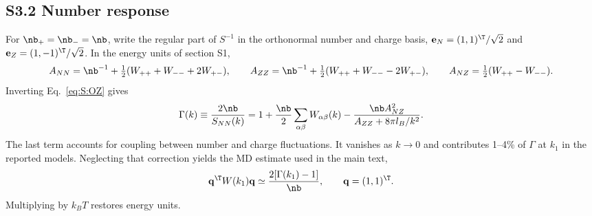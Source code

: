 \subsection*{S3.2 Number response}
For $\nb_+=\nb_-=\nb$, write the regular part of $S^{-1}$ in the orthonormal number and charge basis, $\mathbf e_N=(1,1)^{\T}/\sqrt2$ and $\mathbf e_Z=(1,-1)^{\T}/\sqrt2$. In the energy units of section S1,
\[
A_{NN}=\nb^{-1}+\tfrac12(W_{++}+W_{--}+2W_{+-}),\qquad
A_{ZZ}=\nb^{-1}+\tfrac12(W_{++}+W_{--}-2W_{+-}),\qquad
A_{NZ}=\tfrac12(W_{++}-W_{--}).
\]
Inverting Eq.~\ref{eq:S:OZ} gives
\begin{equation}
\Gamma(k)\equiv\frac{2\nb}{S_{NN}(k)}
=1+\frac{\nb}{2}\sum_{\alpha\beta}W_{\alpha\beta}(k)
-\frac{\nb A_{NZ}^2}{A_{ZZ}+8\pi l_B/k^2}.
\label{eq:S:gamma}
\end{equation}
The last term accounts for coupling between number and charge fluctuations. It vanishes as $k\to0$ and contributes 1--4\% of $\Gamma$ at $k_1$ in the reported models. Neglecting that correction yields the MD estimate used in the main text,
\[
\mathbf q^{\T}W(k_1)\mathbf q\simeq\frac{2[\Gamma(k_1)-1]}{\nb},\qquad \mathbf q=(1,1)^{\T}.
\]
Multiplying by $k_BT$ restores energy units.
